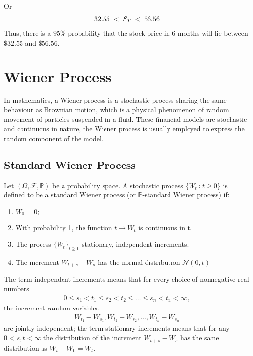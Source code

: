 Or
\begin{align*}
32.55\hspace{0.1cm}<\hspace{0.1cm} S_T \hspace{0.1cm}<\hspace{0.1cm} 56.56
\end{align*} 
Thus, there is a $95\%$ probability that the stock price in 6 months will lie between
$\$32.55$ and $\$56.56$.
\section{Wiener Process}

In mathematics, a Wiener process is a stochastic process sharing the same behaviour as Brownian
motion, which is a physical phenomenon of random movement of particles suspended in a fluid. These financial models are
stochastic and continuous in nature, the Wiener process is usually employed to express the
random component of the model.

\subsection{Standard Wiener Process}
Let $(\Omega,\mathcal{F},\mathbb{P})$ be a probability space. A stochastic process $\{W_t ∶ t \geq 0\}$ is defined to be a standard Wiener process (or $\mathbb{P}$-standard Wiener process) if:
\begin{enumerate}
	\item $W_0 = 0$;
	\item With probability 1, the function $t \to W_t$ is continuous in t.
	\item The process $\{W_t\}_{t\geq 0}$ stationary, independent increments. 
	\item The increment $W_{t+s}-W_s$ has the normal distribution $\mathcal{N}(0,t)$.
\end{enumerate}
The term independent increments means that for every choice of nonnegative real numbers
\begin{align*}
0\leq s_1 < t_1 \leq s_2 < t_2 \leq \dots \leq s_n < t_n <\infty,
\end{align*}
the increment random variables
\begin{align*}
	W_{t_1}-W_{s_1}, W_{t_2}-W_{s_2},\dots, W_{t_n}-W_{s_n}
\end{align*}
are jointly independent; the term stationary increments means that for any $0 < s, t <\infty $ the distribution
of the increment $W_{t+s} −W_s$ has the same distribution as $W_t −W_0=W_t$.
